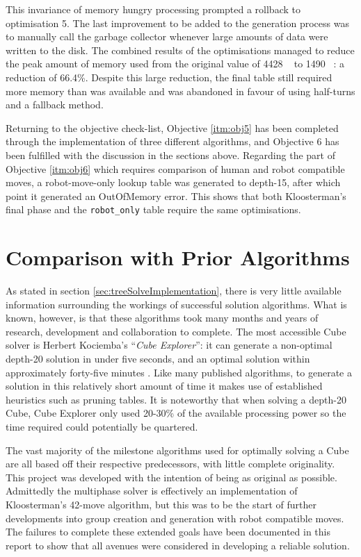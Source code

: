 \documentclass{report}
\newcommand{\tit}[1]{\textit{#1}}
\newcommand{\propernoun}[1]{\enquote{\tit{#1}}}
\newcommand{\depth}[1]{depth-#1}
\begin{document}
    This invariance of memory hungry processing prompted a rollback to optimisation 5. The last improvement to be added to the generation process was to manually call the garbage collector whenever large amounts of data were written to the disk. The combined results of the optimisations managed to reduce the peak amount of memory used from the original value of \num{4428} \si{\mega\byte} to \num{1490} \si{\mega\byte}: a reduction of 66.4\%. Despite this large reduction, the final table still required more memory than was available and was abandoned in favour of using half-turns and a fallback method.
    
    Returning to the objective check-list, Objective \ref{itm:obj5} has been completed through the implementation of three different algorithms, and Objective 6 has been fulfilled with the discussion in the sections above. Regarding the part of Objective \ref{itm:obj6} which requires comparison of human and robot compatible moves, a robot-move-only lookup table was generated to \depth{15}, after which point it generated an OutOfMemory error. This shows that both Kloosterman's final phase and the \lstinline|robot_only| table require the same optimisations.
         
	\section{Comparison with Prior Algorithms}
	
	As stated in section \ref{sec:treeSolveImplementation}, there is very little available information surrounding the workings of successful solution algorithms. What is known, however, is that these algorithms took many months and years of research, development and collaboration to complete. The most accessible Cube solver is Herbert Kociemba's \propernoun{Cube Explorer}: it can generate a non-optimal \depth{20} solution in under five seconds, and an optimal solution within approximately forty-five minutes \cite{Kociemba}. Like many published algorithms, to generate a solution in this relatively short amount of time it makes use of established heuristics such as pruning tables. It is noteworthy that when solving a \depth{20} Cube, Cube Explorer only used 20-30\% of the available processing power so the time required could potentially be quartered.
	
	The vast majority of the milestone algorithms used for optimally solving a Cube are all based off their respective predecessors, with little complete originality. This project was developed with the intention of being as original as possible. Admittedly the multiphase solver is effectively an implementation of Kloosterman's 42-move algorithm, but this was to be the start of further developments into group creation and generation with robot compatible moves. The failures to complete these extended goals have been documented in this report to show that all avenues were considered in developing a reliable solution.
	
\end{document}

